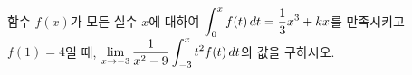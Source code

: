 함수 $f(x)$가 모든 실수 $x$에 대하여 $\displaystyle\int_{0}^{x}f(t)\mkern3mu dt=\dfrac{1}{3}x^3+kx$를 만족시키고 $f(1)=4$일 때, $\displaystyle\lim_{x\to -3}\dfrac{1}{x^2-9}\int_{-3}^{x}t^2f(t)\mkern3mu dt$의 값을 구하시오. 

